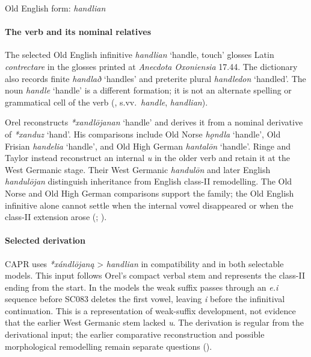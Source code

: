 \documentclass[
  british,
  a4paper,
]{article}
\providecommand{\Recon}[1]{\emph{*#1}}
\begin{document}
Old English form: \emph{handlian}

\paragraph{The verb and its nominal
relatives}\label{the-verb-and-its-nominal-relatives}

The selected Old English infinitive {\emph{handlian}} `handle, touch'
glosses Latin \emph{contrectare} in the glosses printed at
\emph{Anecdota Oxoniensia} 17.44. The dictionary also records finite
\emph{handlað} `handles' and preterite plural \emph{handledon}
`handled'. The noun {\emph{handle}} `handle' is a different formation;
it is not an alternate spelling or grammatical cell of the verb
(,
s.vv.~\emph{handle}, \emph{handlian}).

Orel reconstructs \Recon{xandlōjanan} `handle' and derives it from a
nominal derivative of \Recon{xanduz} `hand'. His comparisons include Old
Norse {\emph{hǫndla}} `handle', Old Frisian \emph{handelia} `handle',
and Old High German \emph{hantalōn} `handle'. Ringe and Taylor instead
reconstruct an internal \emph{u} in the older verb and retain it at the
West Germanic stage. Their West Germanic \emph{handulōn} and later
English \emph{handulōjan} distinguish inheritance from English class-II
remodelling. The Old Norse and Old High German comparisons support the
family; the Old English infinitive alone cannot settle when the internal
vowel disappeared or when the class-II extension arose
(;
).

\paragraph{Selected derivation}\label{selected-derivation-1}

CAPR uses \emph{*xándlōjaną} \textgreater{} \emph{handlian} in
compatibility and in both selectable models. This input follows Orel's
compact verbal stem and represents the class-II ending from the start.
In the models the weak suffix passes through an \emph{e.i} sequence
before SC083 deletes the first vowel, leaving \emph{i} before the
infinitival continuation. This is a representation of weak-suffix
development, not evidence that the earlier West Germanic stem lacked
\emph{u}. The derivation is regular from the derivational input; the
earlier comparative reconstruction and possible morphological
remodelling remain separate questions
().
\end{document}
